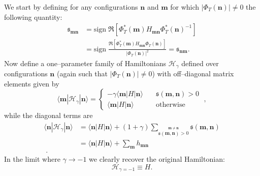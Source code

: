 We start by defining for any configurations $\mathbf{n}$ and $\mathbf{m}$ for which $|\Phi_T(\mathbf{n})| \neq 0$ the following quantity:
\begin{equation}
\begin{split}
\label{CCDMC:ham_sign}
\mathfrak{s}_{\mathbf{m}\mathbf{n}} &= \mbox{sign}\; \Re \left [ \Phi_T^*(\mathbf{m}) H_{\mathbf{m}\mathbf{n}} \Phi_T^*(\mathbf{n})^{-1}\right ]  \\
 &= \mbox{sign} \; \frac{\Re \left [ \Phi_T^*(\mathbf{m}) H_{\mathbf{m}\mathbf{n}} \Phi_T(\mathbf{n})\right ]}{ \lvert \Phi_T (\mathbf{n}) \rvert ^2} = \mathfrak{s}_{\mathbf{n}\mathbf{m}} .
 \end{split}
\end{equation}
Now define a one--parameter family of Hamiltonians $\mathcal{H}_{\gamma}$ defined over configurations $\mathbf{n}$ (again such that
$|\Phi_T(\mathbf{n})| \neq 0$) with off--diagonal matrix elements given by
\begin{equation}
  \label{mh1}
  \langle \mathbf{m} | \mathcal{H}_{\gamma} | \mathbf{n} \rangle  =\left \{ \begin{array}{rl} -\gamma \langle \mathbf{m} | H | \mathbf{n} \rangle&  \quad    \mathfrak{s}(\mathbf{m},\mathbf{n})  > 0 \\
  \langle \mathbf{m} | H | \mathbf{n} \rangle&   \quad  \text{otherwise} \end{array} \right . \;,
\end{equation}
while the diagonal terms are
\begin{equation}
\begin{split}
\label{mh2}
\langle \mathbf{n} | \mathcal{H}_{\gamma} | \mathbf{n} \rangle &= \langle \mathbf{n} | H | \mathbf{n} \rangle+ (1+\gamma) \displaystyle \sum_{\stackrel{ \mathbf{m} \neq
\mathbf{n}}{\mathfrak{s}(\mathbf{m},\mathbf{n}) > 0}} \mathfrak{s} (\mathbf{m},\mathbf{n})\\
&= \langle \mathbf{n} | H | \mathbf{n} \rangle + \sum_{\mathbf{m}} h_{\mathbf{m}\mathbf{n}}\\\;.
\end{split}
\end{equation}
In the limit where $\gamma\to-1$ we clearly recover the original Hamiltonian: 
\begin{equation}
\mathcal{H}_{\gamma = -1} \equiv H .
\end{equation}

